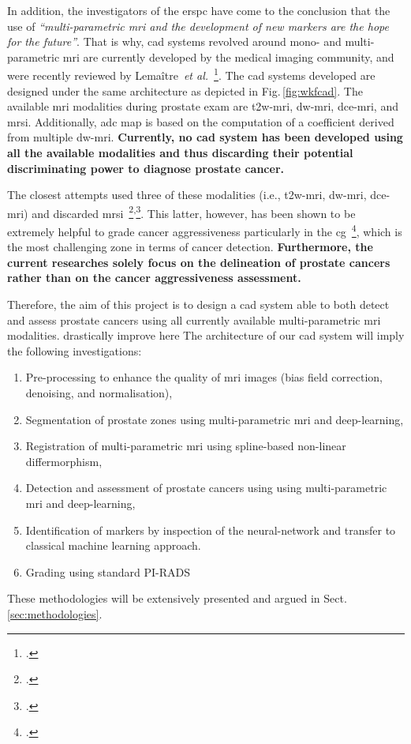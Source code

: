 In addition, the investigators of the \ac{erspc} have come to the conclusion that the use of \emph{``multi-parametric \ac{mri} and the development of new markers are the hope for the future''}.
That is why, \ac{cad} systems revolved around mono- and multi-parametric \ac{mri} are currently developed by the medical imaging community, and were recently reviewed by Lema\^itre~\emph{et al.}~\footcite{Lemaitre2015}.
The \ac{cad} systems developed are designed under the same architecture as depicted in Fig.\,\ref{fig:wkfcad}. 
The available \ac{mri} modalities during prostate exam are \ac{t2w}-\ac{mri}, \ac{dw}-\ac{mri}, \ac{dce}-\ac{mri}, and \ac{mrsi}. 
Additionally, \ac{adc} map is based on the computation of a coefficient derived from multiple \ac{dw}-\ac{mri}.
\textbf{Currently, no \ac{cad} system has been developed using all the available modalities and thus discarding their potential discriminating power to diagnose prostate cancer.}

The closest attempts used three of these modalities (i.e., \ac{t2w}-\ac{mri}, \ac{dw}-\ac{mri}, \ac{dce}-\ac{mri}) and discarded \ac{mrsi}~\footcite{Litjens2014}\textsuperscript{,}\footcite{Viswanath2011}.
This latter, however, has been shown to be extremely helpful to grade cancer aggressiveness particularly in the \ac{cg}~\footcite{Vos2015}, which is the most challenging zone in terms of cancer detection.
\textbf{Furthermore, the current researches solely focus on the delineation of prostate cancers rather than on the cancer aggressiveness assessment.}

Therefore, the aim of this project is to design a \ac{cad} system able to both detect and assess prostate cancers using all currently available multi-parametric \ac{mri} modalities.
{\color{red} drastically improve here}
The architecture of our \ac{cad} system will imply the following investigations: 
\begin{enumerate}
\item Pre-processing to enhance the quality of \ac{mri} images (bias field correction, denoising, and normalisation),
\item Segmentation of prostate zones using multi-parametric \ac{mri} and deep-learning,
\item Registration of multi-parametric \ac{mri} using spline-based non-linear differmorphism,
\item Detection and assessment of prostate cancers using using multi-parametric \ac{mri} and deep-learning,
\item Identification of markers by inspection of the neural-network and transfer to classical machine learning approach.
\item Grading using standard PI-RADS
\end{enumerate}
These methodologies will be extensively presented and argued in Sect.\,\ref{sec:methodologies}.

